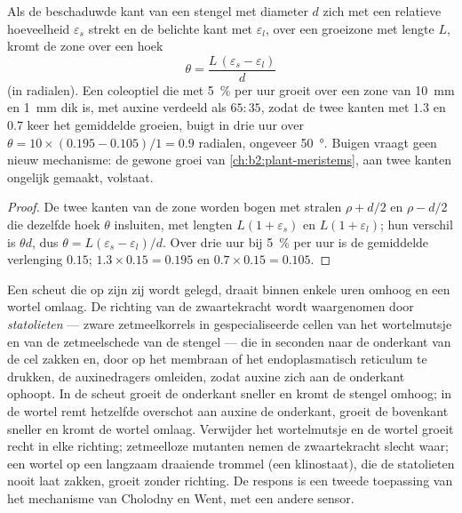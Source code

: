 \begin{theorem}\label{thm:b2:plant-plasticity:bend}
Als de beschaduwde kant van een stengel met diameter $d$ zich met een
relatieve hoeveelheid $\varepsilon_s$ strekt en de belichte kant met
$\varepsilon_l$, over een groeizone met lengte $L$, kromt de zone over een
hoek
\[
\theta = \frac{L\,(\varepsilon_s - \varepsilon_l)}{d}
\]
(in radialen). Een coleoptiel die met \qty{5}{\%} per uur groeit over een
zone van \qty{10}{mm} en \qty{1}{mm} dik is, met auxine verdeeld als
$65 : 35$, zodat de twee kanten met $1.3$ en $0.7$ keer het gemiddelde
groeien, buigt in drie uur over $\theta = 10\times(0.195 - 0.105)/1 =
0.9$ radialen, ongeveer \qty{50}{\degree}. Buigen vraagt geen nieuw
mechanisme: de gewone groei van \cref{ch:b2:plant-meristems}, aan twee
kanten ongelijk gemaakt, volstaat.
\end{theorem}
\begin{proof}
De twee kanten van de zone worden bogen met stralen $\rho + d/2$ en
$\rho - d/2$ die dezelfde hoek $\theta$ insluiten, met lengten $L(1 +
\varepsilon_s)$ en $L(1 + \varepsilon_l)$; hun verschil is
$\theta d$, dus $\theta = L(\varepsilon_s - \varepsilon_l)/d$. Over
drie uur bij \qty{5}{\%} per uur is de gemiddelde verlenging $0.15$;
$1.3\times 0.15 = 0.195$ en $0.7\times 0.15 = 0.105$.
\end{proof}

\begin{proposition}[Gravitropie]\label{prop:b2:plant-plasticity:gravitropism}
Een scheut die op zijn zij wordt gelegd, draait binnen enkele uren omhoog en
een wortel omlaag. De richting van de zwaartekracht wordt waargenomen door
\emph{statolieten} --- zware zetmeelkorrels in gespecialiseerde cellen van
het wortelmutsje en van de zetmeelschede van de stengel --- die in seconden
naar de onderkant van de cel zakken en, door op het membraan of het
endoplasmatisch reticulum te drukken, de auxinedragers omleiden, zodat
auxine zich aan de onderkant ophoopt. In de scheut groeit de onderkant
sneller en kromt de stengel omhoog; in de wortel remt hetzelfde overschot
aan auxine de onderkant, groeit de bovenkant sneller en kromt de wortel
omlaag. Verwijder het wortelmutsje en de wortel groeit recht in elke
richting; zetmeelloze mutanten nemen de zwaartekracht slecht waar; een
wortel op een langzaam draaiende trommel (een klinostaat), die de
statolieten nooit laat zakken, groeit zonder richting. De respons is een
tweede toepassing van het mechanisme van Cholodny en Went, met een andere
sensor.
\end{proposition}

